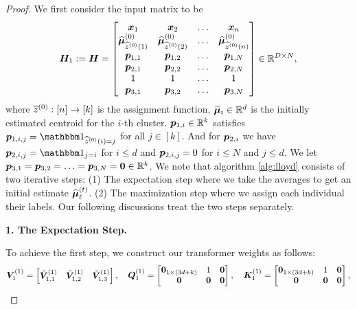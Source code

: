 \begin{proof}
We first consider the input matrix to be 
\begin{align*}
    \boldsymbol{H}_1:=\boldsymbol{H}=\begin{bmatrix}
        \boldsymbol{x}_1&\boldsymbol{x}_2&\ldots&\boldsymbol{x}_n\\
        \widehat{\boldsymbol{\mu}}_{\widehat{z}^{(0)}(1)}^{(0)}&\widehat{\boldsymbol{\mu}}_{\widehat{z}^{(0)}(2)}^{(0)}&\ldots&\widehat{\boldsymbol{\mu}}_{\widehat{z}^{(0)}(n)}^{(0)}\\
        \boldsymbol{p}_{1,1}&\boldsymbol{p}_{1,2}&\ldots&\boldsymbol{p}_{1,N}\\
        \boldsymbol{p}_{2,1}&\boldsymbol{p}_{2,2}&\ldots&\boldsymbol{p}_{2,N}\\
        1&1&\ldots&1\\
        \boldsymbol{p}_{3,1}&\boldsymbol{p}_{3,2}&\ldots&\boldsymbol{p}_{3,N}
    \end{bmatrix}\in\mathbb{R}^{D\times N}, 
\end{align*}
where $\widehat{z}^{(0)}:[n]\to[k]$ is the assignment function, $\widehat{\boldsymbol{\mu}}_i\in\mathbb{R}^{d}$ is the initially estimated centroid for the $i$-th cluster. $\boldsymbol{p}_{1,i}\in\mathbb{R}^k$ satisfies $\bfa p_{1,i,j}=\mbbm 1_{\wh z^{(0)}(i)=j}$ for all $j\in[k]$. And for $\boldsymbol{p}_{2,i}$ we have $\bfa p_{2,i,j} = \mbbm 1_{j=i}$ for $i\leq d$ and $\boldsymbol{p}_{2,i,j}=0$ for $i\leq N$ and $j\leq d$. We let $\boldsymbol{p}_{3,1}=\boldsymbol{p}_{3,2}=\ldots=\boldsymbol{p}_{3,N} = \boldsymbol{0}\in\mathbb{R}^k$.
We note that algorithm \ref{alg:lloyd} consists of two iterative steps: (1) The expectation step where we take the averages to get an initial estimate $\widehat{\boldsymbol{\mu}}_{\ell}^{(t)}$. (2) The maximization step where we assign each individual their labels. Our following discussions treat the two steps separately. 
\begin{center}
    \textbf{1. The Expectation Step.}
\end{center}
To achieve the first step, we construct our transformer weights as follows:
\begin{align*}
    \bfa V_1^{(1)}=\begin{bmatrix}
        \tda V_{1,1}^{(1)}&\tda V_{1,2}^{(1)}&\tda V_{1,3}^{(1)}
    \end{bmatrix},\quad\bfa Q_1^{(1)}=\begin{bmatrix}
        \bfa 0_{1\times(3d+k)}&1&\bfa 0\\
        \bfa 0&\bfa 0&\bfa 0
    \end{bmatrix},\quad\bfa K_1^{(1)}=\begin{bmatrix}
        \bfa 0_{1\times(3d+k)}&1&\bfa 0\\
        \bfa 0&\bfa 0&\bfa 0
    \end{bmatrix},

\end{align*}
\end{proof}

